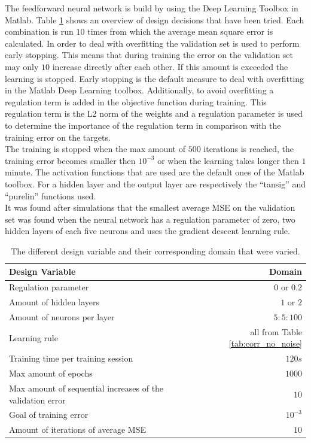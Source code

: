 \documentclass[a4paper,10pt]{article}
\begin{document}
The feedforward neural network is build by using the Deep Learning Toolbox in Matlab. Table \ref{tab:design} shows an overview of design decisions that have been tried. Each combination is run $ 10 $ times from which the average mean square error is calculated. In order to deal with overfitting the validation set is used to perform early stopping. This means that during training the error on the validation set may only $ 10 $ increase directly after each other. If this amount is exceeded the learning is stopped. Early stopping is the default measure to deal with overfitting in the Matlab Deep Learning toolbox. Additionally, to avoid overfitting a regulation term is added in the objective function during training. This regulation term is the L2 norm of the weights and a regulation parameter is used to determine the importance of the regulation term in comparison with the training error on the targets.\\ The training is stopped when the max amount of $ 500 $ iterations is reached, the training error becomes smaller then $ 10^{-3} $ or when the learning takes longer then $ 1 $ minute. The activation functions that are used are the default ones of the Matlab toolbox. For a hidden layer and the output layer are respectively the ``tansig'' and ``purelin'' functions used.\\
It was found after simulations that the smallest average MSE on the validation set was found when the neural network has a regulation parameter of zero, two hidden layers of each five neurons and uses the gradient descent learning rule. \\


\begin{table}
	\centering
	\begin{tabular}{@{}lr@{}} \toprule
		\textbf{Design Variable}    & Domain \\\midrule
		Regulation parameter & $ 0 $ or $ 0.2 $  \\ 
		Amount of hidden layers & $ 1 $ or $ 2 $  \\
		Amount of neurons per layer & $ 5:5:100 $  \\
		Learning rule & all from Table \ref{tab:corr_no_noise}\\
		Training time per training session & $ 120 s $\\
		Max amount of epochs & $ 1000 $\\
		Max amount of sequential increases of the validation error & $ 10 $\\
		Goal of training error & $ 10^{-3} $\\
		Amount of iterations of average MSE & $ 10 $\\\bottomrule
	\end{tabular}
	\caption{The different design variable and their corresponding domain that were varied.}
	\label{tab:design}
\end{table}
\end{document}
